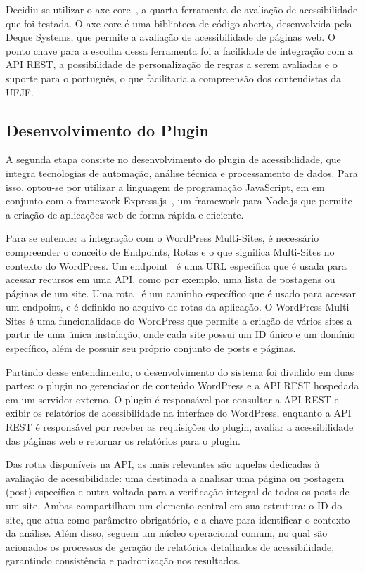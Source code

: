 \documentclass[
	article,			%
	12pt,				%
	oneside,			%
	a4paper,			%
	section=TITLE,		%
	subsection=TITLE,	%
	english,			%
	brazil,				%
	sumario=tradicional
	]{abntex2}
\begin{document}
Decidiu-se utilizar o axe-core~\cite{axecore}, a quarta
ferramenta de avaliação de acessibilidade que foi testada. O axe-core é uma biblioteca
de código aberto, desenvolvida pela Deque Systems, que permite a avaliação de acessibilidade
de páginas web. O ponto chave para a escolha dessa ferramenta foi a facilidade
de integração com a API REST, a possibilidade de personalização de regras a serem
avaliadas e o suporte para o português, o que facilitaria a compreensão dos conteudistas
da UFJF\@.

\subsection{Desenvolvimento do Plugin}
A segunda etapa consiste no desenvolvimento do plugin de acessibilidade, que
integra tecnologias de automação, análise técnica e processamento de
dados. Para isso, optou-se por utilizar a linguagem de programação JavaScript, em
em conjunto com o framework Express.js~\cite{express}, um framework 
para Node.js que permite a criação de aplicações web de forma rápida
e eficiente.

Para se entender a integração com o WordPress Multi-Sites, é necessário compreender 
o conceito de Endpoints, Rotas e o que significa Multi-Sites no contexto do WordPress.
Um endpoint~\cite{endpoints} é uma URL específica que é usada para acessar
recursos em uma API, como por exemplo, uma lista de postagens ou páginas de um site. Uma
rota~\cite{routes} é um caminho específico que é usado para acessar um endpoint,
e é definido no arquivo de rotas da aplicação. O WordPress Multi-Sites é uma funcionalidade
do WordPress que permite a criação de vários sites a partir de uma única instalação,
onde cada site possui um ID único e um domínio específico, além de possuir seu próprio
conjunto de posts e páginas.

Partindo desse entendimento, o desenvolvimento do sistema foi dividido em duas partes: 
o plugin no gerenciador de conteúdo WordPress e a 
API REST hospedada em um servidor externo. O plugin é responsável por
consultar a API REST e exibir os relatórios de acessibilidade na interface do
WordPress, enquanto a API REST é responsável por receber as requisições
do plugin, avaliar a acessibilidade das páginas web e retornar os relatórios
para o plugin.

Das rotas disponíveis na API, as mais relevantes são aquelas dedicadas
à avaliação de acessibilidade: uma destinada a analisar uma página ou postagem (post)
específica e outra voltada para a verificação integral de todos os posts de um
site. Ambas compartilham um elemento central em sua estrutura: o ID do
site, que atua como parâmetro obrigatório, e a chave para identificar o contexto
da análise. Além disso, seguem um núcleo operacional comum, no qual são
acionados os processos de geração de relatórios detalhados de acessibilidade,
garantindo consistência e padronização nos resultados.
\end{document}
